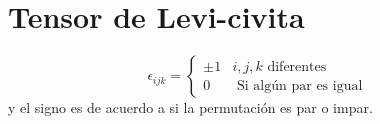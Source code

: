 \documentclass[10pt,oneside]{CBFT_book}
\begin{document}
 
 
\appendix

\chapter{Tensor de Levi-civita}\label{App.levi_civita}

\[
	\epsilon_{ijk} = \begin{cases}
			\pm 1 &  i,j,k \text{ diferentes } \\
	                0     &  \text{ Si algún par es igual }
	                 \end{cases}
\]
y el signo es de acuerdo a si la permutación es par o impar.
\end{document}
